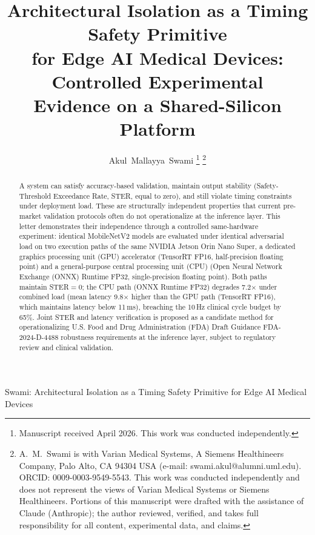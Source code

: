 \documentclass[journal,twoside,9pt]{IEEEtran}
\begin{document}
\title{Architectural Isolation as a Timing Safety Primitive\\
for Edge AI Medical Devices: Controlled Experimental\\
Evidence on a Shared-Silicon Platform}

\author{Akul~Mallayya~Swami%
  \thanks{Manuscript received April 2026. This work was conducted independently.}%
  \thanks{A.~M.~Swami is with Varian Medical Systems, A Siemens Healthineers Company,
  Palo Alto, CA 94304 USA (e-mail: swami.akul@alumni.uml.edu).
  ORCID: 0009-0003-9549-5543.
  This work was conducted independently and does not represent the views of
  Varian Medical Systems or Siemens Healthineers.
  Portions of this manuscript were drafted with the assistance of Claude (Anthropic);
  the author reviewed, verified, and takes full responsibility for all content,
  experimental data, and claims.}%
}

%
{Swami: Architectural Isolation as a Timing Safety Primitive for Edge AI Medical Devices}

\maketitle

\begin{abstract}
A system can satisfy accuracy-based validation, maintain output stability
(Safety-Threshold Exceedance Rate, STER, equal to zero), and still violate timing
constraints under deployment load. These are structurally independent properties that current
pre-market validation protocols often do not operationalize at the inference layer. This letter demonstrates their independence
through a controlled same-hardware experiment: identical MobileNetV2 models are
evaluated under identical adversarial load on two execution paths of the same NVIDIA
Jetson Orin Nano Super, a dedicated graphics processing unit (GPU) accelerator
(TensorRT FP16, half-precision floating point) and a general-purpose central processing
unit (CPU) (Open Neural Network Exchange (ONNX) Runtime FP32, single-precision
floating point). Both paths maintain STER$=0$; the CPU path (ONNX Runtime FP32) degrades 7.2$\times$
under combined load (mean latency 9.8$\times$ higher than the GPU path (TensorRT FP16),
which maintains latency below 11\,ms), breaching the 10\,Hz clinical cycle budget by 65\%. Joint STER
and latency verification is proposed as a candidate method for operationalizing
U.S. Food and Drug Administration (FDA) Draft Guidance FDA-2024-D-4488 robustness
requirements at the inference layer, subject to regulatory review and clinical validation.
\end{abstract}
\end{document}
